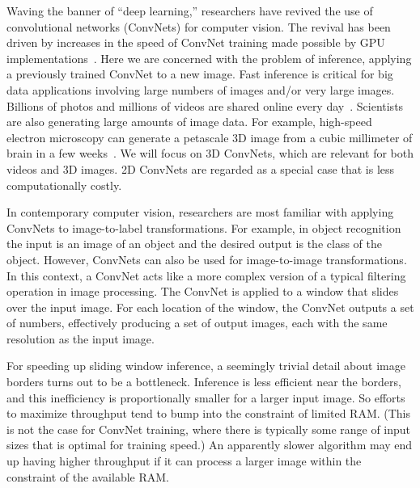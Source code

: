 \documentclass[conference]{./IEEEtran}
\begin{document}
  Waving the banner of ``deep learning,'' researchers have revived the
  use of convolutional networks (ConvNets) for computer vision.  The
  revival has been driven by increases in the speed of ConvNet
  training made possible by GPU
  implementations~\cite{chellapilla2006high, scherer2010accelerating,
  strigl2010performance, ciresan2011flexible}. Here we are concerned
  with the problem of inference, applying a previously trained ConvNet
  to a new image.  Fast inference is critical for big data
  applications involving large numbers of images and/or very large
  images. Billions of photos and millions of videos are shared online
  every day~\cite{MeekerReport14, ReelSEO}.  Scientists are also
  generating large amounts of image data.  For example, high-speed
  electron microscopy can generate a petascale 3D image from a cubic
  millimeter of brain in a few weeks~\cite{Lichtman2014big}.  We will
  focus on 3D ConvNets, which are relevant for both videos and 3D
  images.  2D ConvNets are regarded as a special case that is less
  computationally costly.

  In contemporary computer vision, researchers are most familiar with
  applying ConvNets to image-to-label transformations.  For example,
  in object recognition the input is an image of an object and the
  desired output is the class of the object.  However, ConvNets can
  also be used for image-to-image transformations.  In this context, a
  ConvNet acts like a more complex version of a typical filtering
  operation in image processing.  The ConvNet is applied to a window
  that slides over the input image.  For each location of the window,
  the ConvNet outputs a set of numbers, effectively producing a set of
  output images, each with the same resolution as the input image.

  For speeding up sliding window inference, a seemingly trivial detail
  about image borders turns out to be a bottleneck.  Inference is less
  efficient near the borders, and this inefficiency is proportionally
  smaller for a larger input image.  So efforts to maximize
  throughput tend to bump into the constraint of limited RAM.  (This
  is not the case for ConvNet training, where there is typically some
  range of input sizes that is optimal for training speed.)
  An apparently slower algorithm may end up having higher
  throughput if it can process a larger image within the constraint of
  the available RAM.
\end{document}
